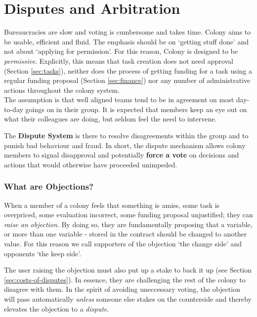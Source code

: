 \section{Disputes and Arbitration}\label{sec:disputes}
Bureaucracies are slow and voting is cumbersome and takes time. Colony aims to be usable, efficient and fluid. The emphasis should be on `getting stuff done' and not about `applying for permission'. For this reason, Colony is designed to be \emph{permissive}. Explicitly, this means that task creation does not need approval (Section \ref{sec:tasks}), neither does the process of getting funding for a task using a regular funding proposal (Section \ref{sec:finance}) nor any number of administrative actions throughout the colony system.\\
The assumption is that well aligned teams tend to be in agreement on most day-to-day goings on in their group. It is expected that members keep an eye out on what their colleagues are doing, but seldom feel the need to intervene. 

The \textbf{Dispute System} is there to resolve disagreements within the group and to punish bad behaviour and fraud. In short, the dispute mechanism allows colony members to signal disapproval and potentially \textbf{force a vote} on decisions and actions that would otherwise have proceeded unimpeded.


\subsubsection*{What are Objections?}
When a member of a colony feels that something is amiss, some task is overpriced, some evaluation incorrect, some funding proposal unjustified; they can \emph{raise an objection}. By doing so, they are fundamentally proposing that a variable, or more than one variable - stored in the  contract should be changed to another value. For this reason we call supporters of the objection `the change side' and opponents `the keep side'.

The user raising the objection must also put up a stake to back it up (see Section \ref{sec:costs-of-disputes}). In essence, they are challenging the rest of the colony to disagree with them. In the spirit of avoiding uneccessary voting, the objection will pass automatically \emph{unless} someone else stakes on the counterside and thereby elevates the objection to a \emph{dispute}.

